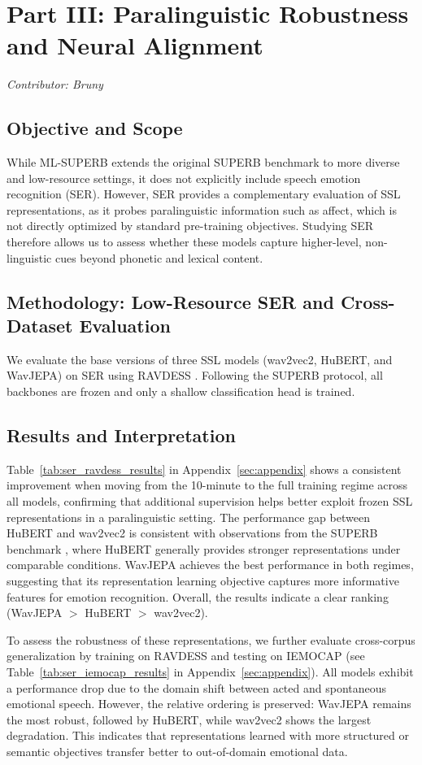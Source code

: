 \documentclass[11pt]{article}
\begin{document}
\section*{Part III: Paralinguistic Robustness and Neural Alignment}
\textit{Contributor: Bruny}

\subsection{Objective and Scope}
While ML-SUPERB extends the original SUPERB benchmark \cite{yang2021superb} to more diverse and low-resource settings, it does not explicitly include speech emotion recognition (SER). However, SER provides a complementary evaluation of SSL representations, as it probes paralinguistic information such as affect, which is not directly optimized by standard pre-training objectives. Studying SER therefore allows us to assess whether these models capture higher-level, non-linguistic cues beyond phonetic and lexical content.

\subsection{Methodology: Low-Resource SER and Cross-Dataset Evaluation}
We evaluate the base versions of three SSL models (wav2vec2, HuBERT, and WavJEPA) on SER using RAVDESS \cite{ravdess}. Following the SUPERB protocol, all backbones are frozen and only a shallow classification head is trained.

\subsection{Results and Interpretation}

Table~\ref{tab:ser_ravdess_results} in Appendix~\ref{sec:appendix} shows a consistent improvement when moving from the 10-minute to the full training regime across all models, confirming that additional supervision helps better exploit frozen SSL representations in a paralinguistic setting. The performance gap between HuBERT and wav2vec2 is consistent with observations from the SUPERB benchmark \cite{yang2021superb}, where HuBERT generally provides stronger representations under comparable conditions. WavJEPA achieves the best performance in both regimes, suggesting that its representation learning objective captures more informative features for emotion recognition. Overall, the results indicate a clear ranking (WavJEPA $>$ HuBERT $>$ wav2vec2).

To assess the robustness of these representations, we further evaluate cross-corpus generalization by training on RAVDESS and testing on IEMOCAP \cite{iemocap} (see Table~\ref{tab:ser_iemocap_results} in Appendix~\ref{sec:appendix}). All models exhibit a performance drop due to the domain shift between acted and spontaneous emotional speech. However, the relative ordering is preserved: WavJEPA remains the most robust, followed by HuBERT, while wav2vec2 shows the largest degradation. This indicates that representations learned with more structured or semantic objectives transfer better to out-of-domain emotional data.
\end{document}
